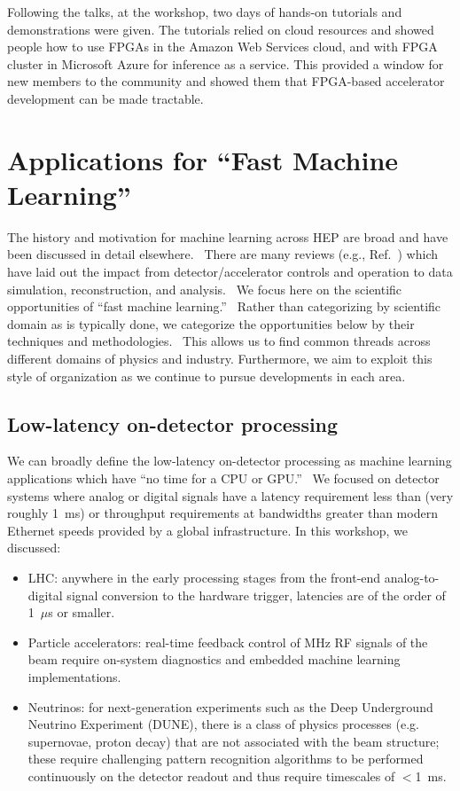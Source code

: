 \documentclass[11pt,letterpaper,fleqn]{article}
\begin{document}
Following the talks, at the workshop, two days of hands-on tutorials and demonstrations were given. The tutorials relied on cloud resources and showed people how to use FPGAs in the Amazon Web Services cloud, and with FPGA cluster in Microsoft Azure for inference as a service. This provided a window for new members to the community and showed them that FPGA-based accelerator development can be made tractable.

\section{Applications for ``Fast Machine Learning''}

The history and motivation for machine learning across HEP are broad and have been discussed in detail elsewhere.  There are many reviews (e.g., Ref.~\cite{Albertsson:2018maf}) which have laid out the impact from detector/accelerator controls and operation to data simulation, reconstruction, and analysis.  We focus here on the scientific opportunities of ``fast machine learning.''  Rather than categorizing by scientific domain as is typically done, we categorize the opportunities below by their techniques and methodologies.  This allows us to find common threads across different domains of physics and industry. Furthermore, we aim to exploit this style of organization as we continue to pursue developments in each area.

\subsection{Low-latency on-detector processing}

We can broadly define the low-latency on-detector processing as machine learning applications which have ``no time for a CPU or GPU.''  We focused on detector systems where analog or digital signals have a latency requirement less than (very roughly 1~ms) or throughput requirements at bandwidths greater than modern Ethernet speeds provided by a global infrastructure. In this workshop, we discussed:

\begin{itemize}[noitemsep,topsep=0pt]
\item LHC: anywhere in the early processing stages from the front-end analog-to-digital signal conversion to the hardware trigger, latencies are of the order of 1~$\mu$s or smaller.
\item Particle accelerators: real-time feedback control of MHz RF signals of the beam require on-system diagnostics and embedded machine learning implementations.
\item Neutrinos: for next-generation experiments such as the Deep Underground Neutrino Experiment (DUNE), there is a class of physics processes (e.g. supernovae, proton decay) that are not associated with the beam structure; these require challenging pattern recognition algorithms to be performed continuously on the detector readout and thus require timescales of $<$1~ms.
\end{itemize}
\end{document}
